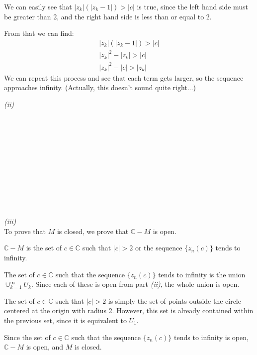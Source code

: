 \begin{enumerate}
We can easily see that $|z_k|(|z_k-1|) > |c|$ is true, since the left hand side must be greater than 2, and the right hand side is less than or equal to 2. 

From that we can find:
\begin{align*}
|z_k|(|z_k-1|) > |c| \\
|z_k|^2 - |z_k| > |c| \\
|z_k|^2 - |c| > |z_k|
\end{align*}
We can repeat this process and see that each term gets larger, so the sequence approaches infinity. (Actually, this doesn't sound quite right...)

\textit{(ii)} \\\\\\\\\\\\\\\\\\\\\\\\

\textit{(iii)} \\
To prove that $M$ is closed, we prove that $\mathbb{C} - M$ is open. 

$\mathbb{C} - M$ is the set of $c \in \mathbb{C}$ such that $|c| > 2$ or the sequence $\{z_n(c)\}$ tends to infinity.

The set of $c \in \mathbb{C}$ such that the sequence $\{z_n(c)\}$ tends to infinity is the union $\cup_{k=1}^{\infty} U_k$. Since each of these is open from part \textit{(ii)}, the whole union is open. 

The set of $c \in \mathbb{C}$ such that $|c| > 2$ is simply the set of points outside the circle centered at the origin with radius 2. However, this set is already contained within the previous set, since it is equivalent to $U_1$. 

Since the set of $c \in \mathbb{C}$ such that the sequence $\{z_n(c)\}$ tends to infinity is open, $\mathbb{C} - M$ is open, and $M$ is closed. 
\end{enumerate}